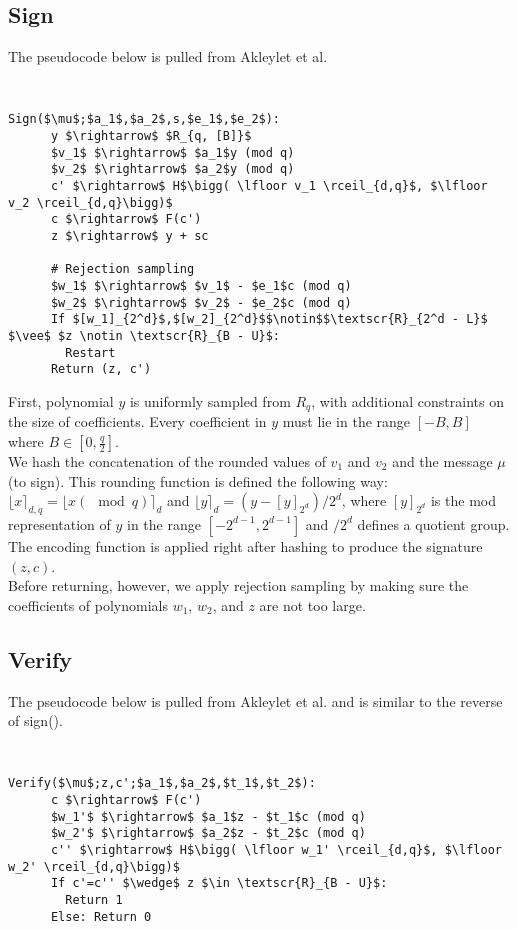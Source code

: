 \documentclass[letterpaper,twocolumn,10pt]{article}
\begin{document}
\subsection{Sign}
The pseudocode below is pulled from Akleylet et al. \cite{rTesla}
{\tt \small
  \begin{lstlisting}[mathescape, columns=flexible]
    Sign($\mu$;$a_1$,$a_2$,s,$e_1$,$e_2$):
      y $\rightarrow$ $R_{q, [B]}$
      $v_1$ $\rightarrow$ $a_1$y (mod q)
      $v_2$ $\rightarrow$ $a_2$y (mod q)
      c' $\rightarrow$ H$\bigg( \lfloor v_1 \rceil_{d,q}$, $\lfloor v_2 \rceil_{d,q}\bigg)$
      c $\rightarrow$ F(c')
      z $\rightarrow$ y + sc

      # Rejection sampling
      $w_1$ $\rightarrow$ $v_1$ - $e_1$c (mod q)
      $w_2$ $\rightarrow$ $v_2$ - $e_2$c (mod q)     
      If $[w_1]_{2^d}$,$[w_2]_{2^d}$$\notin$$\textscr{R}_{2^d - L}$ $\vee$ $z \notin \textscr{R}_{B - U}$:
        Restart
      Return (z, c')
  \end{lstlisting}
}

  First, polynomial $y$ is uniformly sampled from $R_q$, with additional constraints on the size of coefficients. Every coefficient in $y$ must lie in the range $[-B, B]$ where $B \in [0, \frac{q}{2}]$. \\
  We hash the concatenation of the rounded values of $v_1$ and $v_2$ and the message $\mu$ (to sign). This rounding function is defined the following way: $\lfloor x \rceil_{d, q} = \lfloor x (\mod q) \rceil_{d}$ and $\lfloor y \rceil_{d} = (y - [y]_{2^d}) / 2^d$, where $[y]_{2^d}$ is the mod representation of $y$ in the range $[-2^{d-1}, 2^{d-1}]$ and $/ 2^d$ defines a quotient group.\\
  The encoding function is applied right after hashing to produce the signature $(z, c)$.\\
  Before returning, however, we apply rejection sampling by making sure the coefficients of polynomials $w_1$, $w_2$, and $z$ are not too large.

\subsection{Verify}
The pseudocode below is pulled from Akleylet et al. \cite{rTesla} and is similar to the reverse of sign().

{\tt \small
  \begin{lstlisting}[mathescape, columns=flexible]
    Verify($\mu$;z,c';$a_1$,$a_2$,$t_1$,$t_2$):
      c $\rightarrow$ F(c')
      $w_1'$ $\rightarrow$ $a_1$z - $t_1$c (mod q)
      $w_2'$ $\rightarrow$ $a_2$z - $t_2$c (mod q)     
      c'' $\rightarrow$ H$\bigg( \lfloor w_1' \rceil_{d,q}$, $\lfloor w_2' \rceil_{d,q}\bigg)$
      If c'=c'' $\wedge$ z $\in \textscr{R}_{B - U}$:
        Return 1
      Else: Return 0
  \end{lstlisting}
}
\end{document}
